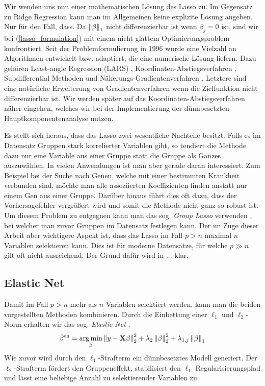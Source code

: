Wir wenden uns nun einer mathematischen Lösung des Lasso zu. Im Gegensatz zu Ridge Regression kann man im Allgemeinen keine explizite Lösung angeben. Nur für den Fall, dass.
Da $\left\lVert \beta \right\rVert_1$ nicht differenzierbar ist wenn $\beta_j = 0$ ist, sind wir bei (\ref{lasso_formulation}) mit einem nicht glattem Optimierungsproblem konfrontiert. Seit der Problemformulierung in 1996 wurde eine Vielzahl an Algorithmen entwickelt bzw. adaptiert, die eine numerische Lösung liefern. Dazu gehören Least-angle Regression (LARS) \cite{efron_lars}, Koordinaten-Abstiegsverfahren \cite{friedman}, Subdifferential Methoden und  Näherungs-Gradientenverfahren \cite{yang, vandenberghe}. Letztere sind eine natürliche Erweiterung von Gradientenverfahren wenn die Zielfunktion nicht differenzierbar ist. Wir werden später auf das Koordinaten-Abstiegsverfahren näher eingehen, welches wir bei der Implementierung der dünnbesetzten Hauptkomponentenanalyse nutzen.

Es stellt sich heraus, dass das Lasso zwei wesentliche Nachteile besitzt. Falls es im Datensatz Gruppen stark korrelierter Variablen gibt, so tendiert die Methode dazu nur eine Variable aus einer Gruppe statt die Gruppe als Ganzes auszuwählen. In vielen Anwendungen ist man aber gerade daran interessiert. Zum Beispiel bei der Suche nach Genen, welche mit einer bestimmten Krankheit verbunden sind, möchte man alle assoziierten Koeffizienten finden anstatt nur einem Gen aus einer Gruppe. Darüber hinaus führt dies oft dazu, dass der Vorhersagefehler vergrößert wird und somit die Methode nicht ganz so robust ist. Um diesem Problem zu entgegnen kann man das sog. \textit{Group Lasso} verwenden \cite{yuan}, bei welcher man zuvor Gruppen im Datensatz festlegen kann. Der im Zuge dieser Arbeit aber wichtigere Aspekt ist, dass das Lasso im Fall $p > n$ maximal $n$ Variablen selektieren kann. Dies ist für moderne Datensätze, für welche $p \gg n$ gilt oft nicht ausreichend. Der Grund dafür wird in ... klar.\\

\subsection{Elastic Net}

Damit im Fall $p > n$ mehr als $n$ Variablen selektiert werden, kann man die beiden vorgestellten Methoden kombinieren. Durch die Einbettung einer $\ell_1$ und $\ell_2$-Norm erhalten wir das sog. \textit{Elastic Net} \cite{zou_elasticnet}.
\begin{align}
\label{elastic_net}
\hat{\beta}^{\text{en}} = \operatorname*{arg\,min}_{\beta} \left\lVert y - \mathbf{X} \beta \right\rVert_2^2 + \lambda_2 \left\lVert \beta \right\rVert_{2}^{2} + \lambda_{1,j} \left\lVert \beta \right\rVert_{1}
\end{align}
Wie zuvor wird durch den $\ell_1$-Strafterm ein dünnbesetztes Modell generiert. Der $\ell_2$-Strafterm fördert den Gruppeneffekt, stabilisiert den $\ell_1$ Regularisierungspfad und lässt eine beliebige Anzahl zu selektierender Variablen zu.

